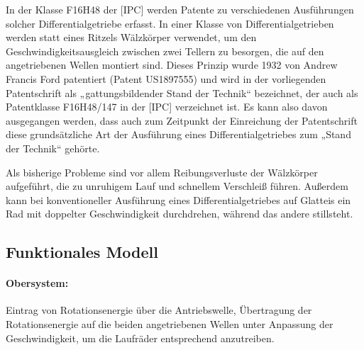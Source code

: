 \documentclass[11pt,a4paper]{article}
\begin{document}
In der Klasse F16H48 der [IPC] werden Patente zu verschiedenen Ausführungen
solcher Differentialgetriebe erfasst.  In einer Klasse von
Differentialgetrieben werden statt eines Ritzels Wälzkörper verwendet, um den
Geschwindigkeitsausgleich zwischen zwei Tellern zu besorgen, die auf den
angetriebenen Wellen montiert sind.  Dieses Prinzip wurde 1932 von Andrew
Francis Ford patentiert (Patent US1897555) und wird in der vorliegenden
Patentschrift als „gattungsbildender Stand der Technik“ bezeichnet, der auch
als Patentklasse F16H48/147 in der [IPC] verzeichnet ist.  Es kann also davon
ausgegangen werden, dass auch zum Zeitpunkt der Einreichung der Patentschrift
diese grundsätzliche Art der Ausführung eines Differentialgetriebes zum „Stand
der Technik“ gehörte.

Als bisherige Probleme sind vor allem Reibungsverluste der Wälzkörper
aufgeführt, die zu unruhigem Lauf und schnellem Verschleiß führen.  Außerdem
kann bei konventioneller Ausfüh\-rung eines Differentialgetriebes auf Glatteis
ein Rad mit doppelter Geschwindigkeit durchdrehen, während das andere
stillsteht.

\subsection{Funktionales Modell}

\paragraph{Obersystem:}
Eintrag von Rotationsenergie über die Antriebswelle, Übertragung der
Rotationsenergie auf die beiden angetriebenen Wellen unter Anpassung der
Geschwindigkeit, um die Laufräder entsprechend anzutreiben. 
\end{document}
